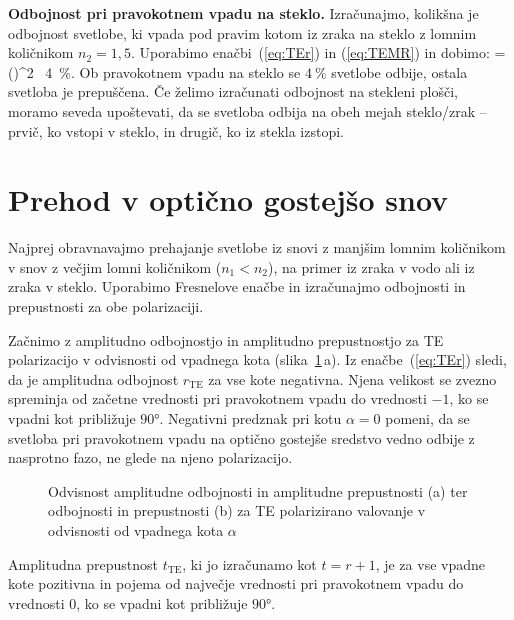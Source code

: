 \begin{example}{\bf Odbojnost pri pravokotnem vpadu na steklo.} 
Izračunajmo, kolikšna je odbojnost svetlobe, ki vpada pod pravim kotom iz zraka na
steklo z lomnim količnikom $n_2=1,5$. Uporabimo enačbi~(\ref{eq:TEr}) in (\ref{eq:TEMR})
in dobimo:
\beq
{} = \left(\right)^2 \approx~4~\%.
\label{eq:04_49}
\eeq
Ob pravokotnem vpadu na steklo se $4~\%$ svetlobe odbije, ostala 
svetloba je prepuščena. Če želimo izračunati odbojnost na stekleni plošči, 
moramo seveda upoštevati, da se svetloba odbija
na obeh mejah steklo/zrak -- prvič, ko vstopi v steklo, in drugič, ko iz stekla
izstopi.
\end{example}

\section{Prehod v optično gostejšo snov}
Najprej obravnavajmo prehajanje svetlobe iz snovi z manjšim lomnim
količnikom v snov z večjim lomni količnikom ($n_1<n_2$), na primer
iz zraka v vodo ali iz zraka v steklo. Uporabimo
Fresnelove enačbe in izračunajmo  odbojnosti in prepustnosti za obe polarizaciji. 

Začnimo z amplitudno odbojnostjo in amplitudno prepustnostjo za TE polarizacijo v odvisnosti
od vpadnega kota (slika~\ref{fig:04_redte}\,a). 
Iz enačbe~(\ref{eq:TEr}) sledi, da je amplitudna odbojnost $r_\mathrm{TE}$
za vse kote negativna. Njena velikost se zvezno spreminja od začetne vrednosti
pri pravokotnem vpadu do vrednosti $-1$, ko se vpadni kot približuje $90\si{\degree}$.
Negativni predznak pri kotu $\alpha =0$ pomeni, da se svetloba pri 
pravokotnem vpadu na optično gostejše sredstvo vedno odbije z nasprotno fazo, ne 
glede na njeno polarizacijo.

\begin{figure}[ht]
\centering
\def\svgwidth{140truemm} 

\caption{Odvisnost amplitudne odbojnosti in amplitudne prepustnosti (a) ter odbojnosti in 
prepustnosti (b) za TE polarizirano valovanje v odvisnosti od vpadnega kota $\alpha$}
\label{fig:04_redte}
\end{figure}

Amplitudna prepustnost $t_\mathrm{TE}$, ki jo izračunamo kot $t=r+1$, je za vse
vpadne kote pozitivna in pojema od največje vrednosti pri pravokotnem vpadu
do vrednosti $0$, ko se vpadni kot približuje $90\si{\degree}$. 

